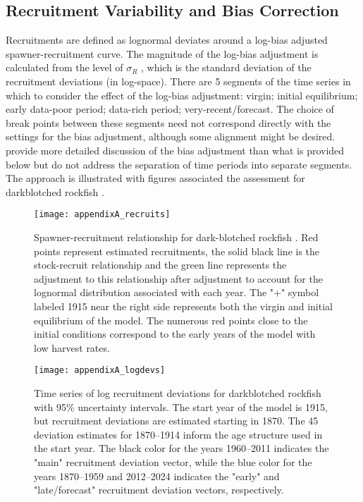 \subsection{Recruitment Variability and Bias Correction}
\hypertarget{BiasCorrect}{}

Recruitments are defined as lognormal deviates around a log-bias adjusted spawner-recruitment curve.  The magnitude of the log-bias adjustment is calculated from the level of $\sigma_R$ , which is the standard deviation of the recruitment deviations (in log-space).  There are 5 segments of the time series in which to consider the effect of the log-bias adjustment: virgin; initial equilibrium; early data-poor period; data-rich period; very-recent/forecast. The choice of break points between these segments need not correspond directly with the settings for the bias adjustment, although some alignment might be desired. \citet{methot-adjusting-2011} provide more detailed discussion of the bias adjustment than what is provided below but do not address the separation of time periods into separate segments. The approach is illustrated with figures associated the assessment for darkblotched rockfish \citep{gertseva-status-2013}.

\begin{figure}[H]
	\begin{center}
		\texttt{[image: appendixA\_recruits]}\\
	\end{center}	
	\caption{Spawner-recruitment relationship for dark-blotched rockfish \citep{gertseva-status-2013}. Red points represent estimated recruitments, the solid black line is the stock-recruit relationship and the green line represents the adjustment to this relationship after adjustment to account for the lognormal distribution associated with each year. The "+" symbol labeled 1915 near the right side represents both the virgin and initial equilibrium of the model. The numerous red points close to the initial conditions correspond to the early years of the model with low harvest rates.}
	\label{fig:recruits}	
\end{figure}

\begin{figure}[H]
	\begin{center}
		\texttt{[image: appendixA\_logdevs]}\\
	\end{center}
\caption{ Time series of log recruitment deviations for darkblotched rockfish with 95\% uncertainty intervals. The start year of the model is 1915, but recruitment deviations are estimated starting in 1870. The 45 deviation estimates for 1870--1914 inform the age structure used in the start year. The black color for the years 1960--2011 indicates the "main" recruitment deviation vector, while the blue color for the years 1870--1959 and 2012--2024 indicates the "early" and "late/forecast" recruitment deviation vectors, respectively.}
\label{fig:recdevs}
\end{figure}

